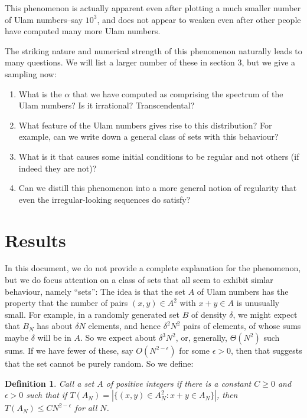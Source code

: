 \documentclass{report}
\newtheorem{definition}[theorem]{Definition}
\theoremstyle{remark}
\numberwithin{equation}{section}
\begin{document}
This phenomenon is actually apparent even after plotting a much
smaller number of Ulam numbers--say $10^3$, and does not appear to
weaken even after other people have computed many more Ulam numbers.

The striking nature and numerical strength of this phenomenon
naturally leads to many questions.  We will list a larger number of
these in section 3, but we give a sampling now: 

\begin{enumerate}
\item What is the $\alpha$ that we have computed as comprising the
  spectrum of the Ulam numbers?  Is it irrational?  Transcendental?

\item What feature of the Ulam numbers gives rise to this
  distribution?  For example, can we write down a general class of
  sets with this behaviour?

\item What is it that causes some initial conditions to be regular and
  not others (if indeed they are not)?

\item Can we distill this phenomenon into a more general notion of
  regularity that even the irregular-looking sequences do satisfy?
\end{enumerate}

\section{Results}

In this document, we do not provide a complete explanation for the
phenomenon, but we do focus attention on a class of sets that all seem
to exhibit simlar behaviour, namely ``\relevant sets'': The idea is
that the set $A$ of Ulam numbers has the property that the number of
pairs $(x, y) \in A^2$ with $x + y \in A$ is unusually small.  For
example, in a randomly generated set $B$ of density $\delta$, we might
expect that $B_N$ has about $\delta N$ elements, and hence
$\delta^2 N^2$ pairs of elements, of whose sums maybe $\delta$ will be
in $A$.  So we expect about $\delta^3 N^2$, or, generally,
$\Theta(N^2)$ such sums.  If we have fewer of these, say
$O(N^{2-\epsilon})$ for some $\epsilon > 0$, then that suggests that
the set cannot be purely random.  So we define:

\begin{definition}Call a set $A$ of positive integers
  \textbf{\relevant}if there is a constant $C \geq 0$ and
  $\epsilon > 0$ such that if
  $T(A_N) = |\{(x, y)\in A_N^2 : x + y \in A_N\}|$, then
  $T(A_N) \leq C N^{2-\epsilon}$ for all $N$.
\end{definition}
\end{document}
